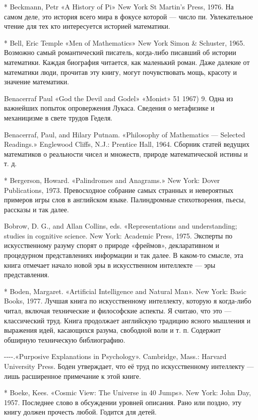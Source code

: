 * Beckmann, Petr «A History of Pi» New York St Martin's Press, 1976. На самом деле, это история всего мира в фокусе которой --- число пи. Увлекательное чтение для тех кто интересуется историей математики.

* Bell, Eric Temple «Men of Mathematics» New York Simon \& Schuster, 1965. Возможно самый романтический писатель, когда-либо писавший об истории математики. Каждая биография читается, как маленький роман. Даже далекие от математики люди, прочитав эту книгу, могут почувствовать мощь, красоту и значение математики.

Benacerraf Paul «God the Devil and Godel» «Monist» 51 1967) 9. Одна из важнейших попыток опровержения Лукаса. Сведения о метафизике и механицизме в свете трудов Геделя.

Benacerraf, Paul, and Hilary Putnam. «Philosophy of Mathematics --- Selected Readings.» Englewood Cliffs, N.J.: Prentice Hall, 1964. Сборник статей ведущих математиков о реальности чисел и множеств, природе математической истины и т. д.

* Bergerson, Howard. «Palindromes and Anagrams.» New York: Dover Publications, 1973. Превосходное собрание самых странных и невероятных примеров игры слов в английском языке. Палиндромные стихотворения, пьесы, рассказы и так далее.

Bobrow, D. G., and Allan Collins, eds. «Representations and understanding; studies in cognitive science. New York: Academic Press, 1975. Эксперты по искусственному разуму спорят о природе «фреймов», декларативном и процедурном представлениях информации и так далее. В каком-то смысле, эта книга отмечает начало новой эры в искусственном интеллекте --- эры представления.

* Boden, Margaret. «Artificial Intelligence and Natural Man». New York: Basic Books, 1977. Лучшая книга по искусственному интеллекту, которую я когда-либо читал, включая технические и философские аспекты. Я считаю, что это --- классический труд. Книга продолжает английскую традицию ясного мышления и выражения идей, касающихся разума, свободной воли и т. п. Содержит обширную техническую библиографию.

-\/-\/-\/-.«Purposive Explanations in Psychology». Cambridge, Mass.: Harvard University Press. Боден утверждает, что её труд по искусственному интеллекту --- лишь расширенное примечание к этой книге.

* Boeke, Kees. «Cosmic View: The Universe in 40 Jumps». New York: John Day, 1957. Последнее слово в обсуждении уровней описания. Рано или поздно, эту книгу должен прочесть любой. Годится для детей.


